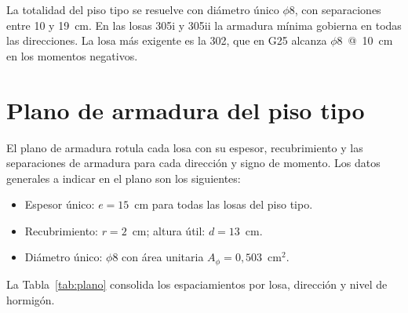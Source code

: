 La totalidad del piso tipo se resuelve con diámetro único $\phi 8$, con separaciones entre 10 y 19~cm. En las losas 305i y 305ii la armadura mínima gobierna en todas las direcciones. La losa más exigente es la 302, que en G25 alcanza $\phi 8$~@~10~cm en los momentos negativos.
 
\section{Plano de armadura del piso tipo}
\label{sec:plano-armadura}
 
El plano de armadura rotula cada losa con su espesor, recubrimiento y las separaciones de armadura para cada dirección y signo de momento. Los datos generales a indicar en el plano son los siguientes:
 
\begin{itemize}
    \item Espesor único: $e = 15$~cm para todas las losas del piso tipo.
    \item Recubrimiento: $r = 2$~cm; altura útil: $d = 13$~cm.
    \item Diámetro único: $\phi 8$ con área unitaria $A_\phi = 0{,}503$~cm$^2$.
\end{itemize}
 
La Tabla~\ref{tab:plano} consolida los espaciamientos por losa, dirección y nivel de hormigón.
 
